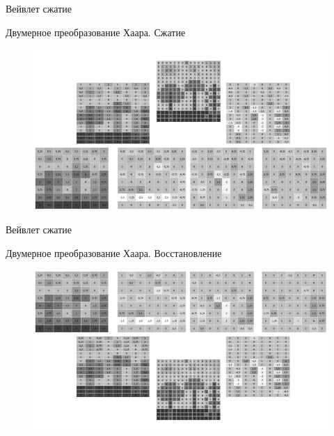 \documentclass[11pt]{beamer}
\begin{document}
\begin{frame}{Вейвлет сжатие}
\begin{block}{Двумерное преобразование Хаара. Сжатие}
\begin{figure}[H]
	\begin{center}
		\includegraphics[scale=0.53]{../pics/wavelet/compression_pr.png}
	\end{center}
\end{figure}	
\end{block}				
\end{frame}



\begin{frame}{Вейвлет сжатие}
\begin{block}{Двумерное преобразование Хаара. Восстановление}
\begin{figure}[H]
	\begin{center}
		\includegraphics[scale=0.53]{../pics/wavelet/uncompression_pr.png}
	\end{center}
\end{figure}	
\end{block}				
\end{frame}
\end{document}
